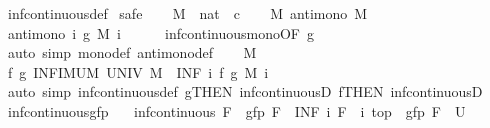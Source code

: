 \begin{isabellebody}
\ inf{\isacharunderscore}continuous{\isacharunderscore}def\isanewline
{}\isamarkupfalse%
\ safe\isanewline
\ \ \isamarkupfalse%
\ M\ {\isacharcolon}{\isacharcolon}\ {\isachardoublequoteopen}nat\ {\isasymRightarrow}\ {\isacharprime}c{\isachardoublequoteclose}\isanewline
\ \ \isamarkupfalse%
\ M{\isacharcolon}\ {\isachardoublequoteopen}antimono\ M{\isachardoublequoteclose}\isanewline
\ \ \isamarkupfalse%
\ \isamarkupfalse%
\ {\isachardoublequoteopen}antimono\ {\isacharparenleft}{\isasymlambda}i{\isachardot}\ g\ {\isacharparenleft}M\ i{\isacharparenright}{\isacharparenright}{\isachardoublequoteclose}\isanewline
\ \ \ \ \isamarkupfalse%
\ inf{\isacharunderscore}continuous{\isacharunderscore}mono{\isacharbrackleft}OF\ g{\isacharbrackright}\ \isamarkupfalse%
\ {\isacharparenleft}auto\ simp{\isacharcolon}\ mono{\isacharunderscore}def\ antimono{\isacharunderscore}def{\isacharparenright}\isanewline
\ \ \isamarkupfalse%
\ M\ \isamarkupfalse%
\ {\isachardoublequoteopen}f\ {\isacharparenleft}g\ {\isacharparenleft}INFIMUM\ UNIV\ M{\isacharparenright}{\isacharparenright}\ {\isacharequal}\ {\isacharparenleft}INF\ i{\isachardot}\ f\ {\isacharparenleft}g\ {\isacharparenleft}M\ i{\isacharparenright}{\isacharparenright}{\isacharparenright}{\isachardoublequoteclose}\isanewline
\ \ \ \ \isamarkupfalse%
\ {\isacharparenleft}auto\ simp{\isacharcolon}\ inf{\isacharunderscore}continuous{\isacharunderscore}def\ g{\isacharbrackleft}THEN\ inf{\isacharunderscore}continuousD{\isacharbrackright}\ f{\isacharbrackleft}THEN\ inf{\isacharunderscore}continuousD{\isacharbrackright}{\isacharparenright}\isanewline
{}\isamarkupfalse%
%
\endisatagproof
{\isafoldproof}%
%
\isadelimproof
\isanewline
%
\endisadelimproof
\isanewline
{}\isamarkupfalse%
\ inf{\isacharunderscore}continuous{\isacharunderscore}gfp{\isacharcolon}\isanewline
\ \ \ {\isachardoublequoteopen}inf{\isacharunderscore}continuous\ F{\isachardoublequoteclose}\ \ {\isachardoublequoteopen}gfp\ F\ {\isacharequal}\ {\isacharparenleft}INF\ i{\isachardot}\ {\isacharparenleft}F\ {\isacharcircum}{\isacharcircum}\ i{\isacharparenright}\ top{\isacharparenright}{\isachardoublequoteclose}\ {\isacharparenleft}\ {\isachardoublequoteopen}gfp\ F\ {\isacharequal}\ {\isacharquery}U{\isachardoublequoteclose}{\isacharparenright}\isanewline
%
\isadelimproof
%
\endisadelimproof
%
\isatagproof
{}\isamarkupfalse%

\end{isabellebody}
